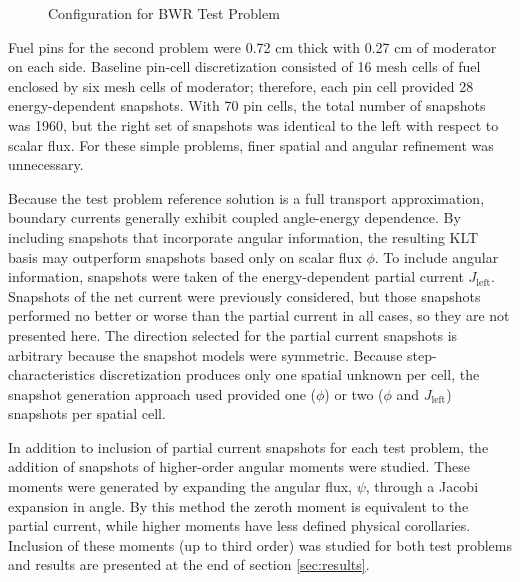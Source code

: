\documentclass[5p,times,twocolumn,10pt]{elsarticle}
\begin{document}
\begin{figure}[htb]
\begin{minipage}[c]{\textwidth}
        \end{minipage}
        \caption{Configuration for BWR Test Problem}
        \label{fig:BWRconfig}
    \end{figure}

    Fuel pins for the second problem were 0.72 cm thick with 0.27 cm of
    moderator on each side. Baseline pin-cell discretization consisted of 16
    mesh cells of fuel enclosed by six mesh cells of moderator; therefore, each
    pin cell provided 28 energy-dependent snapshots. With 70 pin cells, the
    total number of snapshots was 1960, but the right set of snapshots was
    identical to the left with respect to scalar flux.  For these
    simple problems, finer spatial and angular refinement was unnecessary.

    Because the test problem reference solution is a full transport
    approximation, boundary currents generally exhibit coupled angle-energy
    dependence.  By including snapshots that incorporate angular information,
    the resulting KLT basis may outperform snapshots based only on scalar flux
    $\phi$.  To include angular information, snapshots were taken of the
    energy-dependent partial current $J_{\text{left}}$.  Snapshots of the net
    current were previously considered, but those snapshots performed no better
    or worse than the partial current in all cases, so they are not presented
    here.  The direction selected for the partial current snapshots is
    arbitrary because the snapshot
    models were symmetric. Because step-characteristics discretization produces
    only one spatial unknown per cell, the snapshot generation approach used
    provided one ($\phi$) or two ($\phi$ and $J_{\text{left}}$) snapshots per
    spatial cell.

    In addition to inclusion of partial current snapshots for each test
    problem, the addition of snapshots of higher-order angular moments were
    studied.  These moments were generated by expanding the angular flux,
    $\psi$, through a Jacobi expansion in angle.  By this method the zeroth
    moment is equivalent to the partial current, while higher moments have less
    defined physical corollaries.  Inclusion of these moments (up to third
    order) was studied for both test problems and results are presented at the
    end of section \ref{sec:results}.
\end{document}
